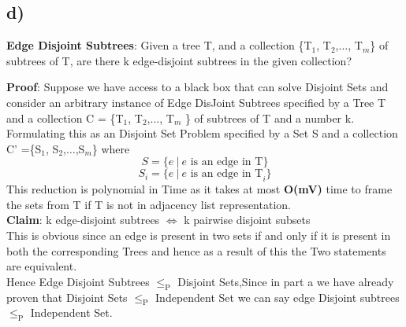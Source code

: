 \documentclass{report}
\begin{document}
 \subsection*{d)}
 \textbf{Edge Disjoint Subtrees}: Given a tree T, and a collection \{T$_1$, T$_2$,$\dots$, T$_m$\} of subtrees of T, are there k edge-disjoint subtrees in the given collection?\vspace*{0.5em}\\
 \textbf{Proof}:  Suppose we have access to a black box that can solve Disjoint Sets and consider an arbitrary instance of Edge DisJoint Subtrees specified by a Tree T and a collection C = \{T$_1$, T$_2$,$\dots$, T$_m$ \} of subtrees of T and a number k.\vspace*{0.2em}\\
 Formulating this as an Disjoint Set Problem specified by a Set S and a collection C' =\{S$_1$, S$_2$,$\dots$,S$_m$\} where
 \begin{equation*}
     S = \{ e \ | \ e \text{ is an edge in T} \}
 \end{equation*}
 \begin{equation*}
     S_i = \{ e \ |\  e \text{ is an edge in T}_i\}
 \end{equation*}
 This reduction is polynomial in Time as it takes at most \textbf{O(mV)} time to frame the sets from T if T is not in adjacency list representation.\vspace*{0.2em}\\
 \textbf{Claim}: k edge-disjoint subtrees $\iff$ k pairwise disjoint subsets \vspace*{0.2em}\\
 This is obvious since an edge is present in two sets if and only if it is present in both the corresponding Trees and hence as a result of this the Two statements are equivalent.\\
 Hence Edge Disjoint Subtrees $\leq_\text{P}$ Disjoint Sets,Since in part a we have already proven that  Disjoint Sets $\leq_\text{P}$ Independent Set we can say edge Disjoint subtrees $\leq_\text{P}$ Independent Set.
 \vspace*{1em}\\
\end{document}
